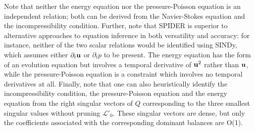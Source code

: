 \documentclass[preprint]{article}
\begin{document}
Note that neither the energy equation nor the pressure-Poisson equation is an independent relation; both can be derived from the Navier-Stokes equation and the incompressibility condition. 
Further, note that SPIDER is superior to alternative approaches to equation inference in both versatility and accuracy: for instance, neither of the two scalar relations would be identified using SINDy, which assumes either $\partial_t{\bf u}$ or  $\partial_tp$ to be present. The energy equation has the form of an evolution equation but involves a temporal derivative of ${\bf u}^2$ rather than ${\bf u}$, while the pressure-Poisson equation is a constraint which involves no temporal derivatives at all. Finally, note that one can also heuristically identify the incompressibility condition, the pressure-Poisson equation and the energy equation from the right singular vectors of $Q$ corresponding to the three smallest singular values without pruning $\mathcal{L}'_0$. These singular vectors are dense, but only the coefficients associated with the corresponding dominant balances are O(1).
\end{document}
